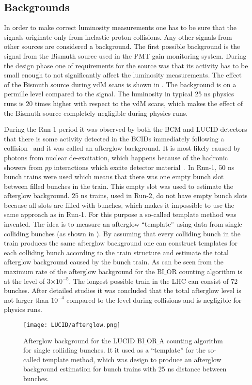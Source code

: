 \subsection{Backgrounds}
\label{subsec:backgrounds}
In order to make correct luminosity measurements one has to be sure that the signals originate only from inelastic proton collisions.
Any other signals from other sources are considered a background.
The first possible background is the signal from the Bismuth source used in the PMT gain monitoring system.
During the design phase one of requirements for the source was that its activity has to be small enough to not significantly affect the luminosity measurements.
The effect of the Bismuth source during vdM scans is shown in . The background is on a permille level compared to the signal.
The luminosity in typical 25 ns physics runs is 20 times higher with respect to the vdM scans, which makes the effect of the Bismuth source completely negligible during physics runs. 

During the Run-1 period it was observed by both the BCM and LUCID detectors that there is some activity detected in the BCIDs immediately following a collision~\cite{Aad:2011dr,Aad:2013ucp}
and it was called an afterglow background. It is most likely caused by photons from nuclear de-excitation, which happens because of the hadronic showers from $pp$ interactions which excite detector material~\cite{Aaboud:2016hhf}.
In Run-1, 50 ns bunch trains were used which means that there was one empty bunch slot between filled bunches in the train.
This empty slot was used to estimate the afterglow background.
25 ns trains, used in Run-2, do not have empty bunch slots because all slots are filled with bunches, which makes it impossible to use the same approach as in Run-1.
For this purpose a so-called template method was invented. The idea is to measure an afterglow ``template'' using data from single colliding bunches (as shown in ).
By assuming that every colliding bunch in the train produces the same afterglow background one can construct templates for each colliding bunch according to the train structure and estimate the total afterglow background caused by the bunch train. 
As can be seen from  the maximum rate of the afterglow background for the BI$\_$OR counting algorithm is at the level of 3$\times10^{-5}$. 
The longest possible train in the LHC can consist of 72 bunches. 
After detailed studies it was concluded that the total afterglow level is not larger than $10^{-4}$ compared to the level during collisions and is negligible for physics runs.
\begin{figure}
\centering
\texttt{[image: LUCID/afterglow.png]}
\caption{Afterglow background for the LUCID BI$\_$OR$\_$A counting algorithm for single colliding bunches. 
It it used as a ``template'' for the so-called template method, which was design
to produce an afterglow background estimation for bunch trains with 25 ns distance between bunches.}
\label{fig:afterglow}
\end{figure}

